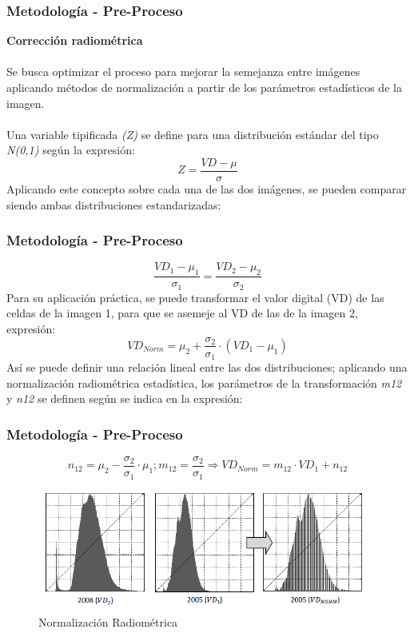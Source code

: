 \documentclass[xcolor=table]{beamer}
\begin{document}
\begin{frame}
	\frametitle{Metodolog\'ia - Pre-Proceso}
	\textbf{Correcci\'on radiom\'etrica}\\~\\	
	Se busca optimizar el proceso para mejorar la semejanza entre im\'agenes aplicando m\'etodos de normalizaci\'on a partir de los par\'ametros estad\'isticos de la imagen.\\~\\
	Una variable tipificada \textit{(Z)} se define para una distribuci\'on est\'andar del tipo \textit{N(0,1)} seg\'un la expresión:
	\begin{equation}
	Z=\dfrac{VD-\mu}{\sigma}
	\end{equation}
	Aplicando este concepto sobre cada una de las dos im\'agenes, se pueden comparar siendo ambas distribuciones estandarizadas:
	
\end{frame}
\begin{frame}
	\frametitle{Metodolog\'ia - Pre-Proceso}
	\begin{equation}
	\dfrac{VD_{1}-\mu_{1}}{\sigma_{1}}=\dfrac{VD_{2}-\mu_{2}}{\sigma_{2}}
	\end{equation}
	Para su aplicación pr\'actica, se puede transformar el valor digital (VD) de las celdas de la imagen 1, para que se asemeje al VD de las de la imagen 2, expresi\'on:
	\begin{equation}
	VD_{Norm}=\mu_{2}+\dfrac{\sigma_{2}}{\sigma_{1}}\cdot(VD_{1}-\mu_{1})
	\end{equation}
	Así se puede definir una relaci\'on lineal entre las dos distribuciones; aplicando una normalizaci\'on radiom\'etrica estad\'istica, los par\'ametros de la transformaci\'on \textit{m12} y \textit{n12} se definen seg\'un se indica en la expresi\'on:

	
\end{frame}
\begin{frame}
	\frametitle{Metodolog\'ia - Pre-Proceso}
	\begin{equation}
	n_{12}=\mu_{2}-\dfrac{\sigma_{2}}{\sigma_{1}}\cdot\mu_{1} ; 
	m_{12}=\dfrac{\sigma_{2}}{\sigma_{1}} \Rightarrow VD_{Norm}=m_{12}\cdot VD_{1}+n_{12}
	\end{equation}
	\begin{figure}
\centering
\includegraphics[width=0.8\linewidth]{imagenes/normalizacion}
\caption{Normalizaci\'on Radiom\'etrica}
\label{fig:normalizacion}
\end{figure}
	
\end{frame}
\end{document}
